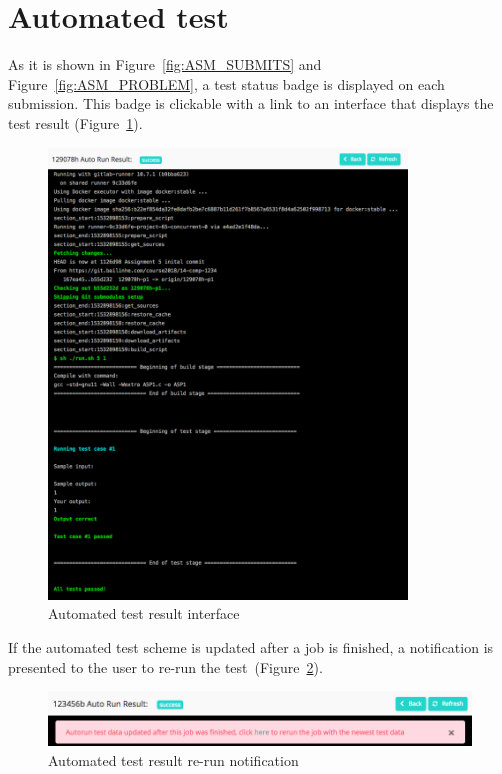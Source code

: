 \section{Automated test}
As it is shown in Figure~\ref{fig:ASM_SUBMITS} and Figure~\ref{fig:ASM_PROBLEM},
a test status badge is displayed on each submission. This badge is clickable
with a link to an interface that displays the test result
(Figure~\ref{fig:TRACE}).

\begin{figure}[H]
    \centering
        \includegraphics[width=0.85\textwidth]{figures/job-trace}
    \caption{Automated test result interface}
    \label{fig:TRACE}
\end{figure}

If the automated test scheme is updated after a job is finished, a notification
is presented to the user to re-run the test~(Figure~\ref{fig:RERUN}).

\begin{figure}[H]
    \centering
        \includegraphics[width=1.0\textwidth]{figures/rerun}
    \caption{Automated test result re-run notification}
    \label{fig:RERUN}
\end{figure}


